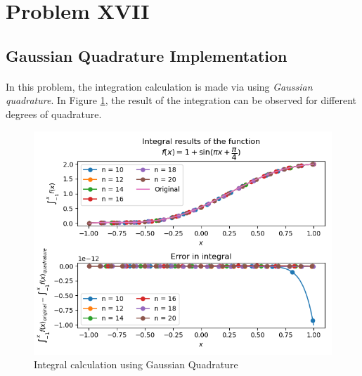 \documentclass[letterpaper,12pt]{article}
\begin{document}
\section{Problem XVII}
\subsection{Gaussian Quadrature Implementation}
\paragraph{} In this problem, the integration calculation is made via using \textit{Gaussian quadrature}. In Figure \ref{fig:17-1}, the result of the integration can be observed for different degrees of quadrature.
\begin{figure}[H]
\centerline{\includegraphics[width=\linewidth]{figures/17-1.png}}
\caption{Integral calculation using Gaussian Quadrature}
\label{fig:17-1}
\end{figure}
\end{document}
